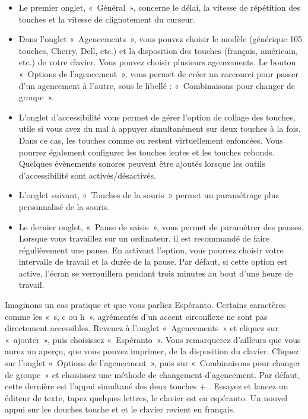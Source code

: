 \begin{itemize}
\item Le premier onglet, «~Général~», concerne le délai, la vitesse de répétition des touches et la vitesse de clignotement du curseur.
\item Dans l'onglet «~Agencements~», vous pouvez choisir le modèle (générique 105 touches, Cherry, Dell, etc.) et la disposition des touches (français, américain, etc.) de votre clavier. Vous pouvez choisir plusieurs agencements. Le bouton «~Options de l'agencement~», vous permet de créer un raccourci pour passer d'un agencement à l'autre, sous le libellé : «~Combinaisons pour changer de groupe~».
\item L'onglet d'accessibilité vous permet de gérer l'option de collage des touches, utile si vous avez du mal à appuyer simultanément sur deux touches à la fois. Dans ce cas, les touches comme  ou  restent virtuellement enfoncées. Vous pourrez également configurer les touches lentes et les touches rebonds. Quelques évènements sonores peuvent être ajoutés lorsque les outils d'accessibilité sont activés/désactivés.
\item L'onglet suivant, «~Touches de la souris~» permet un paramétrage plus personnalisé de la souris. 
\item Le dernier onglet, «~Pause de saisie~», vous permet de paramétrer des pauses. Lorsque vous travaillez sur un ordinateur, il est recommandé de faire régulièrement une pause. En activant l'option, vous pourrez choisir votre intervalle de travail et la durée de la pause. Par défaut, si cette option est active, l'écran se verrouillera pendant trois minutes au bout d'une heure de travail.
\end{itemize}\par
Imaginons un cas pratique et que vous parliez Espéranto. Certains caractères comme les «~s, c ou h~», agrémentés d'un accent circonflexe ne sont pas directement accessibles. Revenez à l'onglet «~Agencements~» et cliquez sur «~ajouter~», puis choisissez «~Espéranto~». Vous remarquerez d'ailleurs que vous aurez un aperçu, que vous pouvez imprimer, de la disposition du clavier. Cliquez sur l'onglet «~Options de l'agencement~», puis sur «~Combinaisons pour changer de groupe~» et choisissez une méthode de changement d'agencement. Par défaut, cette dernière est l'appui simultané des deux touches  + . Essayez et lancez un éditeur de texte, tapez quelques lettres, le clavier est en espéranto. Un nouvel appui sur les douches touche  et  et le clavier revient en français.\\
